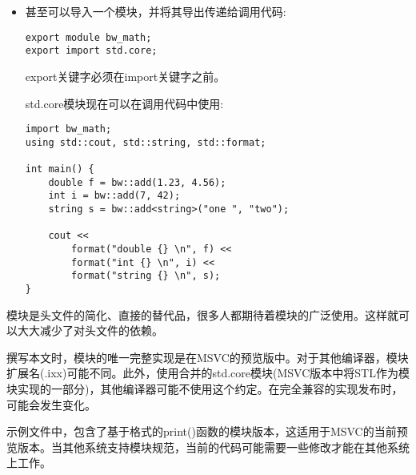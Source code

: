 \begin{itemize}
\item 
甚至可以导入一个模块，并将其导出传递给调用代码:

\begin{lstlisting}[style=styleCXX]
export module bw_math;
export import std.core;
\end{lstlisting}

export关键字必须在import关键字之前。

std.core模块现在可以在调用代码中使用:

\begin{lstlisting}[style=styleCXX]
import bw_math;
using std::cout, std::string, std::format;

int main() {
	double f = bw::add(1.23, 4.56);
	int i = bw::add(7, 42);
	string s = bw::add<string>("one ", "two");
	
	cout <<
		format("double {} \n", f) <<
		format("int {} \n", i) <<
		format("string {} \n", s);
}
\end{lstlisting}

\end{itemize}

模块是头文件的简化、直接的替代品，很多人都期待着模块的广泛使用。这样就可以大大减少了对头文件的依赖。

\begin{tcolorbox}[colback=webgreen!5!white,colframe=webgreen!75!black,title=Note]
撰写本文时，模块的唯一完整实现是在MSVC的预览版中。对于其他编译器，模块扩展名(.ixx)可能不同。此外，使用合并的std.core模块(MSVC版本中将STL作为模块实现的一部分)，其他编译器可能不使用这个约定。在完全兼容的实现发布时，可能会发生变化。
\end{tcolorbox}

示例文件中，包含了基于格式的print()函数的模块版本，这适用于MSVC的当前预览版本。当其他系统支持模块规范，当前的代码可能需要一些修改才能在其他系统上工作。
